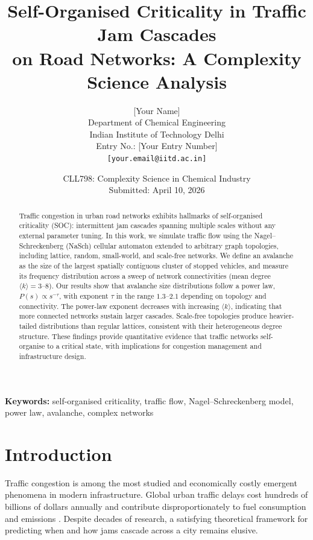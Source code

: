 \documentclass[12pt,a4paper]{article}
\title{
  \textbf{Self-Organised Criticality in Traffic Jam Cascades\\
  on Road Networks: A Complexity Science Analysis}
}
\author{
  [Your Name]\\
  \small Department of Chemical Engineering\\
  \small Indian Institute of Technology Delhi\\
  \small Entry No.: [Your Entry Number]\\
  \small \texttt{[your.email@iitd.ac.in]}
}
\date{CLL798: Complexity Science in Chemical Industry\\
      Submitted: April 10, 2026}
\begin{document}
\maketitle
\linenumbers        %

\begin{abstract}
Traffic congestion in urban road networks exhibits hallmarks of 
self-organised criticality (SOC): intermittent jam cascades spanning
multiple scales without any external parameter tuning. In this work, 
we simulate traffic flow using the Nagel–Schreckenberg (NaSch) 
cellular automaton extended to arbitrary graph topologies, including
lattice, random, small-world, and scale-free networks. We define an 
avalanche as the size of the largest spatially contiguous cluster of 
stopped vehicles, and measure its frequency distribution across a 
sweep of network connectivities (mean degree $\langle k \rangle = 3$--$8$). 
Our results show that avalanche size distributions follow a power law,
$P(s) \propto s^{-\tau}$, with exponent $\tau$ in the range $1.3$--$2.1$ 
depending on topology and connectivity. The power-law exponent decreases 
with increasing $\langle k \rangle$, indicating that more connected 
networks sustain larger cascades. Scale-free topologies produce 
heavier-tailed distributions than regular lattices, consistent with 
their heterogeneous degree structure. These findings provide quantitative 
evidence that traffic networks self-organise to a critical state, with 
implications for congestion management and infrastructure design.
\end{abstract}

\textbf{Keywords:} self-organised criticality, traffic flow, 
Nagel–Schreckenberg model, power law, avalanche, complex networks

\newpage
\tableofcontents
\newpage

\section{Introduction}
\label{sec:intro}

Traffic congestion is among the most studied and economically 
costly emergent phenomena in modern infrastructure. Global urban 
traffic delays cost hundreds of billions of dollars annually and 
contribute disproportionately to fuel consumption and emissions 
\citep{schrank2021}. Despite decades of research, a satisfying 
theoretical framework for predicting when and how jams cascade 
across a city remains elusive.
\end{document}
